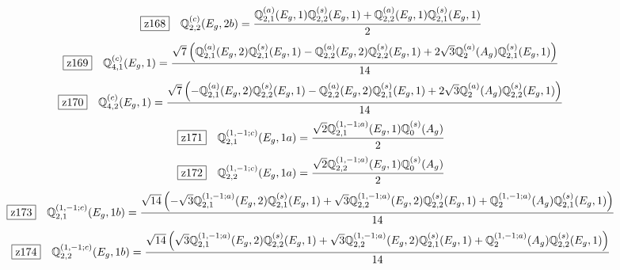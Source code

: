\documentclass[fleqn,10pt,landscape]{jsarticle}
\begin{document}
\begin{dmath*}
\hspace*{3mm}\fbox{z168}\quad \mathbb{Q}_{2,2}^{(c)}(E_{g},2b)=\frac{\mathbb{Q}_{2,1}^{(a)}(E_{g},1) \mathbb{Q}_{2,2}^{(s)}(E_{g},1) + \mathbb{Q}_{2,2}^{(a)}(E_{g},1) \mathbb{Q}_{2,1}^{(s)}(E_{g},1)}{2}
\end{dmath*}
\begin{dmath*}
\hspace*{3mm}\fbox{z169}\quad \mathbb{Q}_{4,1}^{(c)}(E_{g},1)=\frac{\sqrt{7} \left(\mathbb{Q}_{2,1}^{(a)}(E_{g},2) \mathbb{Q}_{2,1}^{(s)}(E_{g},1) - \mathbb{Q}_{2,2}^{(a)}(E_{g},2) \mathbb{Q}_{2,2}^{(s)}(E_{g},1) + 2 \sqrt{3} \mathbb{Q}_{2}^{(a)}(A_{g}) \mathbb{Q}_{2,1}^{(s)}(E_{g},1)\right)}{14}
\end{dmath*}
\begin{dmath*}
\hspace*{3mm}\fbox{z170}\quad \mathbb{Q}_{4,2}^{(c)}(E_{g},1)=\frac{\sqrt{7} \left(- \mathbb{Q}_{2,1}^{(a)}(E_{g},2) \mathbb{Q}_{2,2}^{(s)}(E_{g},1) - \mathbb{Q}_{2,2}^{(a)}(E_{g},2) \mathbb{Q}_{2,1}^{(s)}(E_{g},1) + 2 \sqrt{3} \mathbb{Q}_{2}^{(a)}(A_{g}) \mathbb{Q}_{2,2}^{(s)}(E_{g},1)\right)}{14}
\end{dmath*}
\begin{dmath*}
\hspace*{3mm}\fbox{z171}\quad \mathbb{Q}_{2,1}^{(1,-1;c)}(E_{g},1a)=\frac{\sqrt{2} \mathbb{Q}_{2,1}^{(1,-1;a)}(E_{g},1) \mathbb{Q}_{0}^{(s)}(A_{g})}{2}
\end{dmath*}
\begin{dmath*}
\hspace*{3mm}\fbox{z172}\quad \mathbb{Q}_{2,2}^{(1,-1;c)}(E_{g},1a)=\frac{\sqrt{2} \mathbb{Q}_{2,2}^{(1,-1;a)}(E_{g},1) \mathbb{Q}_{0}^{(s)}(A_{g})}{2}
\end{dmath*}
\begin{dmath*}
\hspace*{3mm}\fbox{z173}\quad \mathbb{Q}_{2,1}^{(1,-1;c)}(E_{g},1b)=\frac{\sqrt{14} \left(- \sqrt{3} \mathbb{Q}_{2,1}^{(1,-1;a)}(E_{g},2) \mathbb{Q}_{2,1}^{(s)}(E_{g},1) + \sqrt{3} \mathbb{Q}_{2,2}^{(1,-1;a)}(E_{g},2) \mathbb{Q}_{2,2}^{(s)}(E_{g},1) + \mathbb{Q}_{2}^{(1,-1;a)}(A_{g}) \mathbb{Q}_{2,1}^{(s)}(E_{g},1)\right)}{14}
\end{dmath*}
\begin{dmath*}
\hspace*{3mm}\fbox{z174}\quad \mathbb{Q}_{2,2}^{(1,-1;c)}(E_{g},1b)=\frac{\sqrt{14} \left(\sqrt{3} \mathbb{Q}_{2,1}^{(1,-1;a)}(E_{g},2) \mathbb{Q}_{2,2}^{(s)}(E_{g},1) + \sqrt{3} \mathbb{Q}_{2,2}^{(1,-1;a)}(E_{g},2) \mathbb{Q}_{2,1}^{(s)}(E_{g},1) + \mathbb{Q}_{2}^{(1,-1;a)}(A_{g}) \mathbb{Q}_{2,2}^{(s)}(E_{g},1)\right)}{14}
\end{dmath*}
\end{document}
